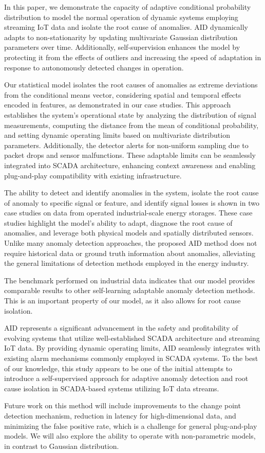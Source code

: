 In this paper, we demonstrate the capacity of adaptive conditional probability distribution to model the normal operation of dynamic systems employing streaming IoT data and isolate the root cause of anomalies. AID dynamically adapts to non-stationarity by updating multivariate Gaussian distribution parameters over time. Additionally, self-supervision enhances the model by protecting it from the effects of outliers and increasing the speed of adaptation in response to autonomously detected changes in operation.

Our statistical model isolates the root causes of anomalies as extreme deviations from the conditional means vector, considering spatial and temporal effects encoded in features, as demonstrated in our case studies. This approach establishes the system's operational state by analyzing the distribution of signal measurements, computing the distance from the mean of conditional probability, and setting dynamic operating limits based on multivariate distribution parameters. Additionally, the detector alerts for non-uniform sampling due to packet drops and sensor malfunctions. These adaptable limits can be seamlessly integrated into SCADA architecture, enhancing context awareness and enabling plug-and-play compatibility with existing infrastructure.

The ability to detect and identify anomalies in the system, isolate the root cause of anomaly to specific signal or feature, and identify signal losses is shown in two case studies on data from operated industrial-scale energy storages. These case studies highlight the model's ability to adapt, diagnose the root cause of anomalies, and leverage both physical models and spatially distributed sensors. Unlike many anomaly detection approaches, the proposed AID method does not require historical data or ground truth information about anomalies, alleviating the general limitations of detection methods employed in the energy industry.

The benchmark performed on industrial data indicates that our model provides comparable results to other self-learning adaptable anomaly detection methods. This is an important property of our model, as it also allows for root cause isolation.

AID represents a significant advancement in the safety and profitability of evolving systems that utilize well-established SCADA architecture and streaming IoT data. By providing dynamic operating limits, AID seamlessly integrates with existing alarm mechanisms commonly employed in SCADA systems. To the best of our knowledge, this study appears to be one of the initial attempts to introduce a self-supervised approach for adaptive anomaly detection and root cause isolation in SCADA-based systems utilizing IoT data streams.

Future work on this method will include improvements to the change point detection mechanism, reduction in latency for high-dimensional data, and minimizing the false positive rate, which is a challenge for general plug-and-play models. We will also explore the ability to operate with non-parametric models, in contrast to Gaussian distribution.
